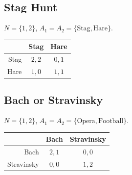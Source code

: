 \documentclass[11pt]{article}
\theoremstyle{definition}
\theoremstyle{plain}
\begin{document}
\subsection*{Stag Hunt}

$N = \{1, 2\}$, $A_1 = A_2 = \{\text{Stag}, \text{Hare}\}$.

\begin{center}
\begin{tabular}{r|c|c|}
  & Stag & Hare \\\hline
Stag & $2, 2$ & $0, 1$ \\\hline
Hare & $1, 0$ & $1, 1$ \\\hline
\end{tabular}
\end{center}

\subsection*{Bach or Stravinsky}

$N = \{1, 2\}$, $A_1 = A_2 = \{\text{Opera}, \text{Football}\}$.

\begin{center}
\begin{tabular}{r|c|c|}
  & Bach & Stravinsky \\\hline
Bach & $2, 1$ & $0, 0$ \\\hline
Stravinsky & $0, 0$ & $1, 2$ \\\hline
\end{tabular}
\end{center}
\end{document}
